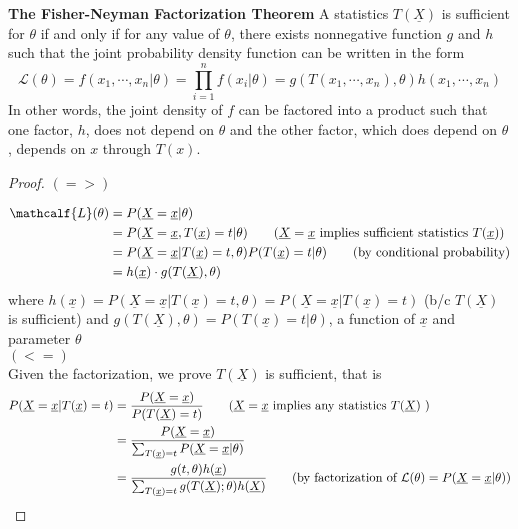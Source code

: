 \documentclass[11pt]{article}
\begin{document}
\begin{theorem*}
  \textbf{The Fisher-Neyman Factorization Theorem} A statistics $T(\underline{X})$ is sufficient for $\theta$ if and only if for any value of $\theta$, there exists nonnegative function $g$ and $h$ such that the joint probability density function can be written in the form
  \[
    \mathcal{L}(\theta) = f(x_1, \cdots, x_n | \theta) =  \prod_{i=1}^n f(x_i | \theta) = g(T(x_1, \cdots, x_n), \theta)h(x_1, \cdots, x_n)
  \]
  In other words, the joint density of $f$ can be factored into a product such that one factor, $h$, does not depend on $\theta$ and the other factor, which does depend on $\theta$, depends on $x$ through $T(x)$.
  \begin{proof}
    $(=>)$

    \begin{align*}
      \mathcalf{L}(\theta) &= P(\underline{X} = \underline{x} | \theta)\\
      &=P(\underline{X} = \underline{x}, T(\underline{x}) = t | \theta) \tag{$\underline{X} = \underline{x}$ implies sufficient statistics $T(\underline{x})$}\\
      &= P(\underline{X} = \underline{x} | T(\underline{x}) = t,  \theta) P(T(\underline{x}) = t| \theta) \tag{by conditional probability} \\
      &= h(\underline{x})\cdot g(T(\underline{X}), \theta)
    \end{align*}
    where $h(\underline{x}) = P(\underline{X} = \underline{x} | T(\underline{x}) = t,  \theta) = P(\underline{X} = \underline{x} | T(\underline{x}) = t)$ (b/c $T(\underline{X})$ is sufficient) and $g(T(\underline{X}), \theta) = P(T(\underline{x}) = t| \theta)$, a function of $\underline{x}$ and parameter $\theta$\\
    $(<=)$\\
    Given the factorization, we prove $T(\underline{X})$ is sufficient, that is
    \begin{align*}
      P(\underline{X} = \underline{x} | T(\underline{x}) = t) &= \frac{P(\underline{X} = \underline{x})}{P(T(\underline{X}) = t)} \tag{$\underline{X} = \underline{x}$ implies any statistics $T(\underline{X})$ } \\
      &= \frac{P(\underline{X} = \underline{x})}{ \sum_{T(\underline{x}) = t} P(\underline{X} = \underline{x} | \theta) }  \\
      &= \frac{g(t, \theta) h(\underline{x})}{ \sum_{T(\underline{x}) = t}  g(T(\underline{X}); \theta)h(\underline{X})  } \tag{by factorization of $\mathcal{L}(\theta) = P(\underline{X} = \underline{x} | \theta)$}  \\

\end{align*}
\end{proof}
\end{theorem*}
\end{document}

